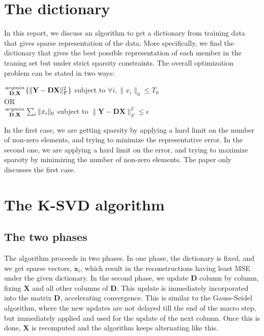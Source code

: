 \documentclass[10pt,a4paper,final]{article}
\begin{document}
\section{The dictionary}
In this report, we discuss an algorithm to get a dictionary from training data that gives sparse representation of the data. More specifically, we find the dictionary that gives the best possible representation of each member in the traning set but under strict sparsity constraints. The overall optimization problem can be stated in two ways: \\
\begin{center}
$\genfrac{}{}{0pt}{}{argmin}{\mathbf{D},\mathbf{X}}\{\|\mathbf{Y}-\mathbf{DX}\|_F^2\}$ subject to $\forall i, \|x_i\|_0 \leq T_0$\\
OR\\
$\genfrac{}{}{0pt}{}{argmin}{\mathbf{D}, \mathbf{X}}\sum_i\|x_i\|_0$ subject to $\|\mathbf{Y}-\mathbf{DX}\|_F^2 \leq \epsilon$\\
\end{center}
In the first case, we are getting sparsity by applying a hard limit on the number of non-zero elements, and trying to minimize the representative error. In the second one, we are applying a hard limit on the error, and trying to maximize sparsity by minimizing the number of non-zero elements. The paper only discusses the first case. \pagebreak
\section{The K-SVD algorithm}
\subsection{The two phases}
The algorithm proceeds in two phases. In one phase, the dictionary is fixed, and we get sparse vectors, $\mathbf{x}_i$, which result in the reconstructions having least MSE under the given dictionary. 
In the second phase, we update $\mathbf{D}$ column by column, fixing $\mathbf{X}$ and all other columns of $\mathbf{D}$. This update is immediately incorporated into the matrix $\mathbf{D}$, accelerating convergence. This is similar to the Gauss-Seidel algorithm, where the new updates are not delayed till the end of the macro step, but immediately applied and used for the update of the next column. Once this is done, $\mathbf{X}$ is recomputed and the algorithm keeps alternating like this.
\end{document}
